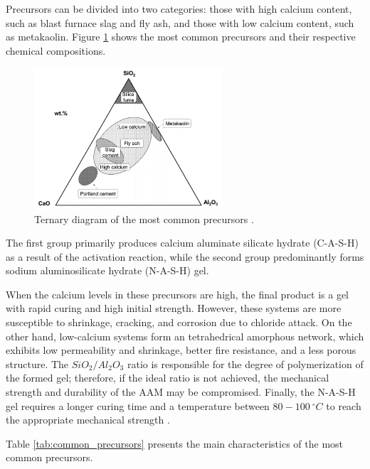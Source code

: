 Precursors can be divided into two categories: those with high calcium content, such as blast furnace slag and fly ash, and those with low calcium content, such as metakaolin.
Figure \ref{fig:ternary_diagram} shows the most common precursors and their respective chemical compositions.

\begin{figure}[ht]
  \centering
  \includegraphics[width=0.625\textwidth]{Cap2/ternary_diagram.png}
  \caption{Ternary diagram of the most common precursors \cite{giergiczny2019fly}.}
  \label{fig:ternary_diagram}
\end{figure}

The first group primarily produces calcium aluminate silicate hydrate (C-A-S-H) as a result of the activation reaction, while the second group predominantly forms sodium aluminosilicate hydrate (N-A-S-H) gel.

When the calcium levels in these precursors are high, the final product is a gel with rapid curing and high initial strength. However, these systems are more susceptible to shrinkage, cracking, and corrosion due to chloride attack.
On the other hand, low-calcium systems form an tetrahedrical amorphous network, which exhibits low permeability and shrinkage, better fire resistance, and a less porous structure.
The $SiO_2/Al_2O_3$ ratio is responsible for the degree of polymerization of the formed gel; therefore, if the ideal ratio is not achieved, the mechanical strength and durability of the AAM may be compromised.
Finally, the N-A-S-H gel requires a longer curing time and a temperature between $80-100\ ^\circ C$ to reach the appropriate mechanical strength \cite{Nodehi2021}.

Table \ref{tab:common_precursors} presents the main characteristics of the most common precursors.

